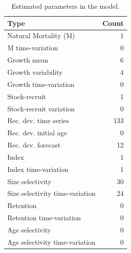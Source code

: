 \documentclass[
]{scrartcl}
\begin{document}
\endgroup

\newpage{}

\begingroup
\fontsize{9.0pt}{10.8pt}\selectfont

\begin{longtable}{lr}

\caption{\label{tbl-n-param}Estimated parameters in the model.}

\tabularnewline

\toprule
Type & Count \\ 
\midrule\addlinespace[2.5pt]
Natural Mortality (M) & 1 \\ 
M time-variation & 0 \\ 
Growth mean & 6 \\ 
Growth variability & 4 \\ 
Growth time-variation & 0 \\ 
Stock-recruit & 1 \\ 
Stock-recruit variation & 0 \\ 
Rec. dev. time series & 133 \\ 
Rec. dev. initial age & 0 \\ 
Rec. dev. forecast & 12 \\ 
Index & 1 \\ 
Index time-variation & 1 \\ 
Size selectivity & 30 \\ 
Size selectivity time-variation & 24 \\ 
Retention & 0 \\ 
Retention time-variation & 0 \\ 
Age selectivity & 0 \\ 
Age selectivity time-variation & 0 \\ 
\bottomrule

\end{longtable}

\endgroup

\newpage{}

\begingroup
\fontsize{9.0pt}{10.8pt}\selectfont
\end{document}

